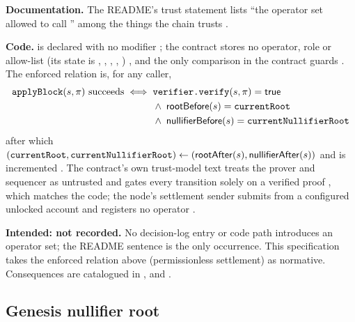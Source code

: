 \begin{specdelta}
\label{delta:operator}
\textbf{Documentation.} The README's trust statement lists ``the operator set
allowed to call '' among the things the chain trusts
.

\textbf{Code.}  is declared  with no modifier
; the contract stores no operator,
role or allow-list (its state is , ,
, , )
, and the only 
comparison in the contract guards 
. The enforced relation is, for any
caller,
\begin{align}
  \texttt{applyBlock}(s,\pi)\ \text{succeeds} \iff\;
   & \texttt{verifier.verify}(s,\pi)=\mathsf{true} \notag\\
   & \wedge\; \mathsf{rootBefore}(s)=\texttt{currentRoot} \notag\\
   & \wedge\; \mathsf{nullifierBefore}(s)=\texttt{currentNullifierRoot}
\end{align}
after which $(\texttt{currentRoot},\texttt{currentNullifierRoot}) \leftarrow
(\mathsf{rootAfter}(s),\mathsf{nullifierAfter}(s))$ and  is
incremented . The contract's own
trust-model text treats the prover and sequencer as untrusted and gates every
transition solely on a verified proof
, which matches the code; the node's
settlement sender submits from a configured unlocked account and registers no
operator .

\textbf{Intended: not recorded.} No decision-log entry or code path introduces
an operator set; the README sentence is the only occurrence. This
specification takes the enforced relation above (permissionless settlement)
as normative. Consequences are catalogued in , 
and .
\end{specdelta}

\subsection{Genesis nullifier root}
\label{subsec:delta-empty-root}

